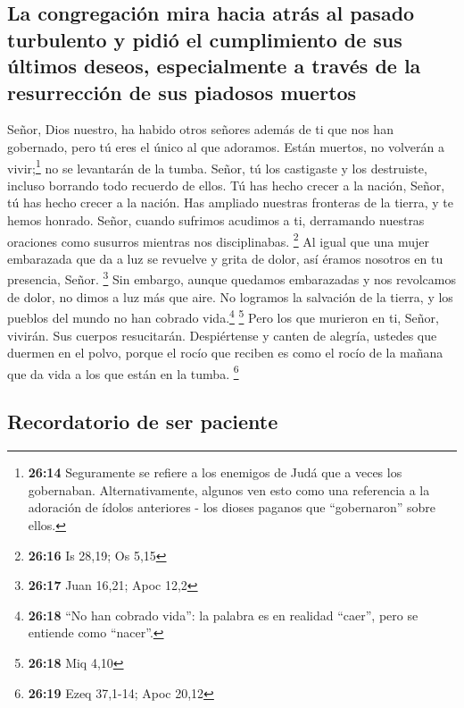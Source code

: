 \hypertarget{la-congregaciuxf3n-mira-hacia-atruxe1s-al-pasado-turbulento-y-pidiuxf3-el-cumplimiento-de-sus-uxfaltimos-deseos-especialmente-a-travuxe9s-de-la-resurrecciuxf3n-de-sus-piadosos-muertos}{%
\subsection{La congregación mira hacia atrás al pasado turbulento y
pidió el cumplimiento de sus últimos deseos, especialmente a través de
la resurrección de sus piadosos
muertos}\label{la-congregaciuxf3n-mira-hacia-atruxe1s-al-pasado-turbulento-y-pidiuxf3-el-cumplimiento-de-sus-uxfaltimos-deseos-especialmente-a-travuxe9s-de-la-resurrecciuxf3n-de-sus-piadosos-muertos}}

 Señor, Dios nuestro, ha habido otros señores además de
ti que nos han gobernado, pero tú eres el único al que adoramos.
 Están muertos, no volverán a vivir;\footnote{\textbf{26:14}
  Seguramente se refiere a los enemigos de Judá que a veces los
  gobernaban. Alternativamente, algunos ven esto como una referencia a
  la adoración de ídolos anteriores - los dioses paganos que
  ``gobernaron'' sobre ellos.} no se levantarán de la tumba. Señor, tú
los castigaste y los destruiste, incluso borrando todo recuerdo de
ellos.  Tú has hecho crecer a la nación, Señor, tú has
hecho crecer a la nación. Has ampliado nuestras fronteras de la tierra,
y te hemos honrado.  Señor, cuando sufrimos acudimos a
ti, derramando nuestras oraciones como susurros mientras nos
disciplinabas. \footnote{\textbf{26:16} Is 28,19; Os 5,15}
 Al igual que una mujer embarazada que da a luz se
revuelve y grita de dolor, así éramos nosotros en tu presencia, Señor.
\footnote{\textbf{26:17} Juan 16,21; Apoc 12,2}  Sin
embargo, aunque quedamos embarazadas y nos revolcamos de dolor, no dimos
a luz más que aire. No logramos la salvación de la tierra, y los pueblos
del mundo no han cobrado vida.\footnote{\textbf{26:18} ``No han cobrado
  vida'': la palabra es en realidad ``caer'', pero se entiende como
  ``nacer''.} \footnote{\textbf{26:18} Miq 4,10}  Pero
los que murieron en ti, Señor, vivirán. Sus cuerpos resucitarán.
Despiértense y canten de alegría, ustedes que duermen en el polvo,
porque el rocío que reciben es como el rocío de la mañana que da vida a
los que están en la tumba. \footnote{\textbf{26:19} Ezeq 37,1-14; Apoc
  20,12}

\hypertarget{recordatorio-de-ser-paciente}{%
\subsection{Recordatorio de ser
paciente}\label{recordatorio-de-ser-paciente}}

